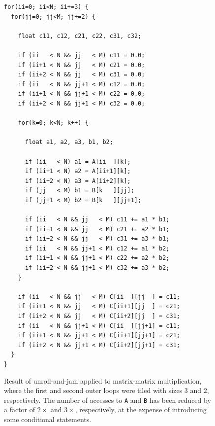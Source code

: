 \begin{figure}
\begin{lstlisting}[mathescape=true]
for(ii=0; ii<N; ii+=3) {
  for(jj=0; jj<M; jj+=2) {

    float c11, c12, c21, c22, c31, c32;

    if (ii   < N && jj   < M) c11 = 0.0;
    if (ii+1 < N && jj   < M) c21 = 0.0;
    if (ii+2 < N && jj   < M) c31 = 0.0;
    if (ii   < N && jj+1 < M) c12 = 0.0;
    if (ii+1 < N && jj+1 < M) c22 = 0.0;
    if (ii+2 < N && jj+1 < M) c32 = 0.0;

    for(k=0; k<N; k++) {

      float a1, a2, a3, b1, b2;

      if (ii   < N) a1 = A[ii  ][k];
      if (ii+1 < N) a2 = A[ii+1][k];
      if (ii+2 < N) a3 = A[ii+2][k];
      if (jj   < M) b1 = B[k   ][jj];
      if (jj+1 < M) b2 = B[k   ][jj+1];

      if (ii   < N && jj   < M) c11 += a1 * b1;
      if (ii+1 < N && jj   < M) c21 += a2 * b1;
      if (ii+2 < N && jj   < M) c31 += a3 * b1;
      if (ii   < N && jj+1 < M) c12 += a1 * b2;
      if (ii+1 < N && jj+1 < M) c22 += a2 * b2;
      if (ii+2 < N && jj+1 < M) c32 += a3 * b2;
    }

    if (ii   < N && jj   < M) C[ii  ][jj  ] = c11;
    if (ii+1 < N && jj   < M) C[ii+1][jj  ] = c21;
    if (ii+2 < N && jj   < M) C[ii+2][jj  ] = c31;
    if (ii   < N && jj+1 < M) C[ii  ][jj+1] = c11;
    if (ii+1 < N && jj+1 < M) C[ii+1][jj+1] = c21;
    if (ii+2 < N && jj+1 < M) C[ii+2][jj+1] = c31;
  }
}
\end{lstlisting}
  \caption{Result of unroll-and-jam applied to matrix-matrix
    multiplication, where the first and second outer loops were tiled
    with sizes $3$ and $2$, respectively. The number of accesses to
    \texttt{A} and \texttt{B} has been reduced by a factor of
    $2\times$ and $3\times$, respectively, at the expense of
    introducing some conditional statements.}
  \label{fig-unroll-jam}
\end{figure}

